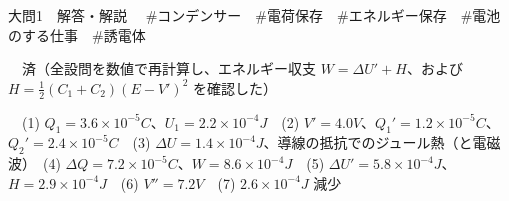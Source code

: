 \documentclass[paper=b5, fontsize=8pt, fleqn, twoside]{jlreq}
\begin{document}
\begin{ascolorbox4A}[75点・30分]{大問1　解答・解説}
　\#コンデンサー　\#電荷保存　\#エネルギー保存　\#電池のする仕事　\#誘電体\par
{}　済（全設問を数値で再計算し、エネルギー収支 $W=\Delta U'+H$、および $H=\tfrac{1}{2}(C_1+C_2)(E-V')^2$ を確認した）\par
{}　(1) $Q_1=3.6\times10^{-5}\unit{C}$、$U_1=2.2\times10^{-4}\unit{J}$　(2) $V'=4.0\unit{V}$、$Q_1'=1.2\times10^{-5}\unit{C}$、$Q_2'=2.4\times10^{-5}\unit{C}$　(3) $\Delta U=1.4\times10^{-4}\unit{J}$、導線の抵抗でのジュール熱（と電磁波）　(4) $\Delta Q=7.2\times10^{-5}\unit{C}$、$W=8.6\times10^{-4}\unit{J}$　(5) $\Delta U'=5.8\times10^{-4}\unit{J}$、$H=2.9\times10^{-4}\unit{J}$　(6) $V''=7.2\unit{V}$　(7) $2.6\times10^{-4}\unit{J}$ 減少
\end{ascolorbox4A}
\end{document}

